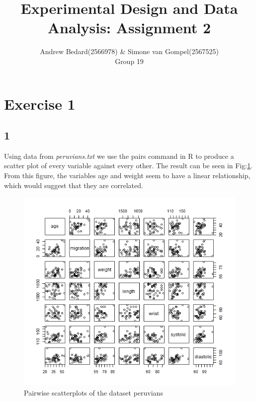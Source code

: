 \documentclass{article}
\title{Experimental Design and Data Analysis: Assignment 2}
\author{Andrew Bedard(2566978) \& Simone van Gompel(2567525) \\ Group 19}
\begin{document}
  \maketitle

  \section{Exercise 1}
  \subsection*{1}
  Using data from \textit{peruvians.txt} we use the pairs command in R to produce a scatter plot of every variable against every other. The result can be seen in Fig:\ref{fig:Pairs}. From this figure, the variables age and weight seem to have a linear relationship, which would suggest that they are correlated.

    \begin{figure}[H]
      \includegraphics[scale=0.6]{../results/Pairs.png}
      \caption{Pairwise scatterplots of the dataset peruvians}
      \label{fig:Pairs}
    \end{figure}
    
\end{document}
